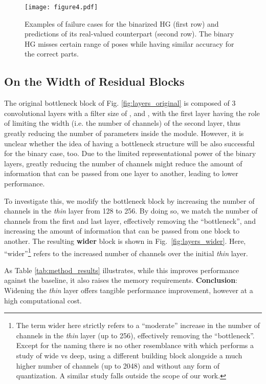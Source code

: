 \documentclass[10pt,journal,compsoc]{IEEEtran}
\begin{document}
\begin{figure}[!htb]
    \centering
    \texttt{[image: figure4.pdf]}
    \caption{Examples of failure cases for the binarized HG (first row) and  predictions of its real-valued counterpart (second row). The binary HG misses certain range of poses while having similar accuracy for the correct parts.}
    \label{fig:fails}
\end{figure}

\subsection{On the Width of Residual Blocks} \label{ssec:wide_block}

The original bottleneck block of Fig. \ref{fig:layers_original} is composed of 3 convolutional layers with a filter size of ,  and , with the first layer having the role of limiting the width (i.e. the number of channels) of the second layer, thus greatly reducing the number of parameters inside the module. However, it is unclear whether the idea of having a bottleneck structure will be also successful for the binary case, too. Due to the limited representational power of the binary layers, greatly reducing the number of channels  might reduce the amount of information that can be passed from one layer to another, leading to lower performance.

To investigate this, we modify the bottleneck block by increasing the number of channels in the \textit{thin}  layer from 128 to 256. By doing so, we match the number of channels from the first and last layer, effectively removing the ``bottleneck'', and increasing the amount of information that can be passed from one block to another. The resulting \textbf{wider} block is shown in Fig.~\ref{fig:layers_wider}. Here, ``wider''\footnote {The term wider here strictly refers to a ``moderate'' increase in the number of channels in the \textit{thin} layer (up to 256), effectively removing the ``bottleneck''. Except for the naming there is no other resemblance with \cite{zagoruyko2016wide} which performs a study of wide vs deep, using a different building block alongside a much higher number of channels (up to 2048) and without any form of quantization. A similar study falls outside the scope of our work.}  refers to the increased number of channels over the initial \textit{thin} layer.

As Table \ref{tab:method_results} illustrates, while this improves performance against the baseline, it also raises the memory requirements. \newline \textbf{Conclusion}: Widening the \textit{thin} layer offers tangible performance improvement, however at a high computational cost.
\end{document}
